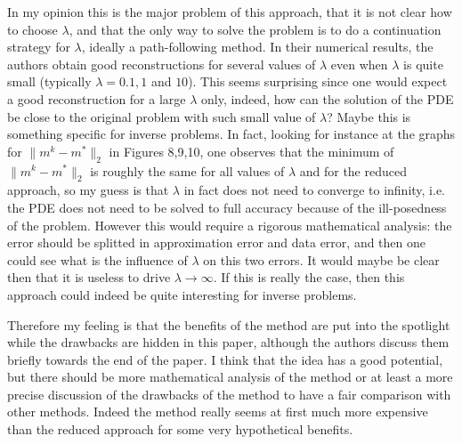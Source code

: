 \documentclass[12pt]{article}
\begin{document}
In my opinion this is the major problem of this approach, that it is not clear how to choose $\lambda$, and that the only way to solve the problem is to do a continuation strategy for $\lambda$, ideally a path-following method. In their numerical results, the authors obtain good reconstructions for several values of $\lambda$ even when $\lambda$ is quite small (typically $\lambda=0.1,1$ and $10$). This seems surprising since one would expect a good reconstruction for a large $\lambda$ only, indeed, how can the solution of the PDE be close to the original problem with such small value of $\lambda$? Maybe this is something specific for inverse problems. In fact, looking for instance at the graphs for $\|m^k - m^*\|_2$ in Figures 8,9,10, one observes that the minimum of $\|m^k - m^*\|_2$ is roughly the same for all values of $\lambda$ and for the reduced approach, so my guess is that $\lambda$ in fact does not need to converge to infinity, i.e. the PDE does not need to be solved to full accuracy because of the ill-posedness of the problem. However this would require a rigorous mathematical analysis: the error should be splitted in approximation error and data error, and then one could see what is the influence of $\lambda$ on this two errors. It would maybe be clear then that it is useless to drive $\lambda\to\infty$. If this is really the case, then this approach could indeed be quite interesting for inverse problems. 


Therefore my feeling is that the benefits of the method are put into the spotlight while the drawbacks are hidden in this paper, although the authors discuss them briefly towards the end of the paper. I think that the idea has a good potential, but there should be more mathematical analysis of the method or at least a more precise discussion of the drawbacks of the method to have a fair comparison with other methods. Indeed the method really seems at first much more expensive than the reduced approach for some very hypothetical benefits. 
\end{document}
